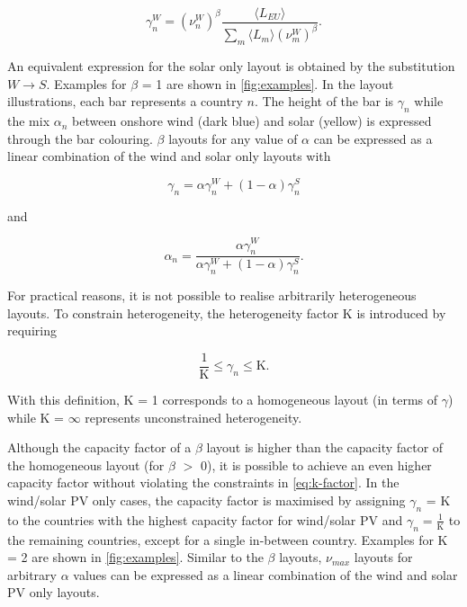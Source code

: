 \documentclass[a4paper, 5p, sort&compress]{elsarticle}%
\newcommand{\paren}[1]{\left(#1\right)}
\begin{document}
\begin{equation}
  \label{eq:8}
  \gamma_{n}^{W} = \paren{\nu^{W}_{n}}^{\beta} \frac{\langle L_{EU}
    \rangle}{\sum_{m} \langle L_{m}
    \rangle \paren{\nu^{W}_{m}}^{\beta}}.
\end{equation}

An equivalent expression for the solar only layout is obtained by the
substitution $W \to S$. Examples for $\beta$ = 1 are shown in
\cref{fig:examples}. In the layout illustrations, each bar represents
a country $n$. The height of the bar is $\gamma_{n}$ while the mix
$\alpha_{n}$ between onshore wind (dark blue) and solar (yellow) is
expressed through the bar colouring. $\beta$ layouts for any value of
$\alpha$ can be expressed as a linear combination of the wind and solar
only layouts with


\begin{equation}
  \label{eq:9}
  \gamma_{n} = \alpha \gamma^{W}_{n} + (1-\alpha) \gamma^{S}_{n} 
\end{equation}

and

\begin{equation}
  \label{eq:9}
  \alpha_{n} = \frac{\alpha \gamma_{n}^{W}}{\alpha \gamma_{n}^{W} + (1-\alpha) \gamma_{n}^{S}} .
\end{equation}


For practical reasons, it is not possible to realise arbitrarily
heterogeneous layouts. To constrain heterogeneity, the heterogeneity
factor K is introduced by requiring

\begin{equation}
  \label{eq:k-factor}
  \frac{1}{\text{K}} \leq \gamma_{n} \leq \text{K} .
\end{equation}

With this definition, K = 1 corresponds to a homogeneous layout (in
terms of $\gamma$) while K = $\infty$ represents unconstrained
heterogeneity.

Although the capacity factor of a $\beta$ layout is higher than the
capacity factor of the homogeneous layout (for $\beta$ $>$ 0), it is
possible to achieve an even higher capacity factor without violating
the constraints in \cref{eq:k-factor}. In the wind/solar PV only
cases, the capacity factor is maximised by assigning $\gamma_{n}$ = K to
the countries with the highest capacity factor for wind/solar PV and
$\gamma_{n} = \frac{1}{\text{K}}$ to the remaining countries, except for a
single in-between country. Examples for K = 2 are shown in
\cref{fig:examples}. Similar to the $\beta$ layouts, $\nu_{max}$ layouts for
arbitrary $\alpha$ values can be expressed as a linear combination of the
wind and solar PV only layouts.
\end{document}
